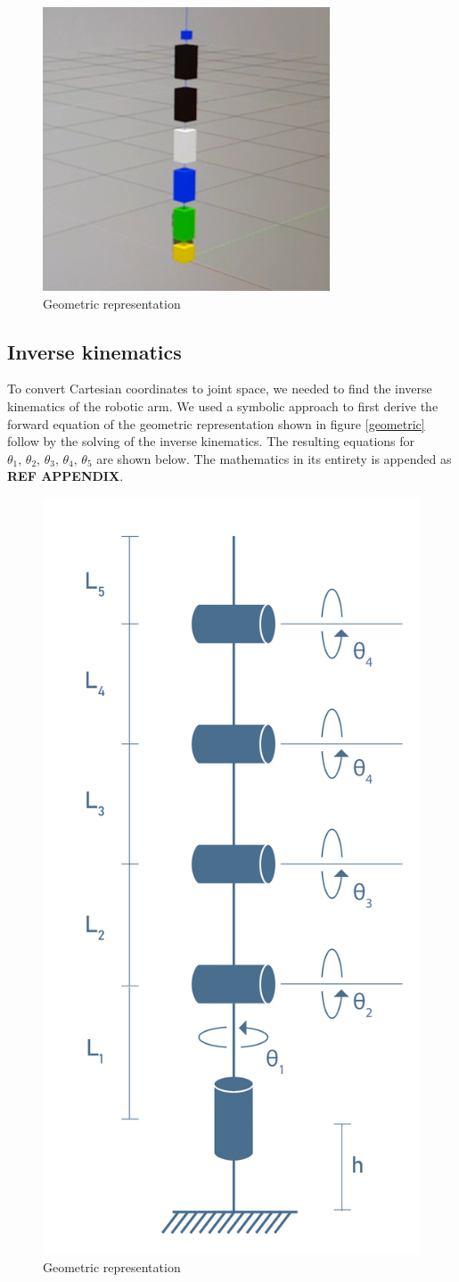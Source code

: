 \documentclass[11pt,a4paper, titlepage]{article}
\begin{document}
	\begin{figure}[H]
		\centering
		\includegraphics[width=0.5\linewidth]{../Diagrams/URDF-first.png}
		\caption{Geometric representation}
		\label{fig:geometric}
	\end{figure}
	
	\subsection{Inverse kinematics}
	To convert Cartesian coordinates to joint space, we needed to find the inverse kinematics of the robotic arm. We used a symbolic approach to first derive the forward equation of the geometric representation shown in figure \ref{geometric} follow by the solving of the inverse kinematics. The resulting equations for $\theta_1,\,\theta_2,\,\theta_3,\,\theta_4,\,\theta_5$ are shown below. The mathematics in its entirety is appended as \textbf{REF APPENDIX}.
	
	\begin{figure}[H]
		\centering
		\includegraphics[width=0.3\linewidth]{../Diagrams/Model.png}
		\caption{Geometric representation}
		\label{fig:geometric}
	\end{figure}
	
\end{document}
